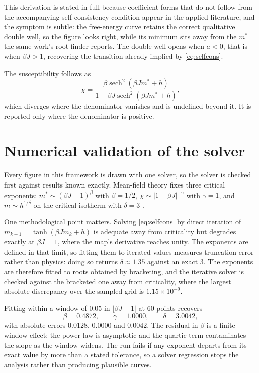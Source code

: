 This derivation is stated in full because coefficient forms that do not follow from the
accompanying self-consistency condition appear in the applied literature, and the symptom is
subtle: the free-energy curve retains the correct qualitative double well, so the figure looks
right, while its minimum sits away from the $m^\ast$ the same work's root-finder reports. The
double well opens when $a < 0$, that is when $\beta J > 1$, recovering the transition already
implied by \eqref{eq:selfcons}.

The susceptibility follows as
\begin{equation}
\chi = \frac{\beta \operatorname{sech}^2(\beta J m^\ast + h)}
            {1 - \beta J \operatorname{sech}^2(\beta J m^\ast + h)},
\label{eq:chi}
\end{equation}
which diverges where the denominator vanishes and is undefined beyond it. It is reported only
where the denominator is positive.

\section{Numerical validation of the solver}

Every figure in this framework is drawn with one solver, so the solver is checked first
against results known exactly. Mean-field theory fixes three critical exponents:
$m^\ast \sim (\beta J - 1)^{\beta}$ with $\beta = 1/2$, $\chi \sim |1-\beta J|^{-\gamma}$ with
$\gamma = 1$, and $m \sim h^{1/\delta}$ on the critical isotherm with $\delta = 3$
\cite{goldenfeld1992}.

One methodological point matters. Solving \eqref{eq:selfcons} by direct iteration of
$m_{k+1} = \tanh(\beta J m_k + h)$ is adequate away from criticality but degrades exactly at
$\beta J = 1$, where the map's derivative reaches unity. The exponents are defined in that
limit, so fitting them to iterated values measures truncation error rather than physics: doing
so returns $\delta \approx 1.35$ against an exact $3$. The exponents are therefore fitted to
roots obtained by bracketing, and the iterative solver is checked against the bracketed one
away from criticality, where the largest absolute discrepancy over the sampled grid is
$1.15\times10^{-9}$.

Fitting within a window of $0.05$ in $|\beta J - 1|$ at 60 points recovers
\begin{equation}
\beta = 0.4872, \qquad \gamma = 1.0000, \qquad \delta = 3.0042,
\end{equation}
with absolute errors $0.0128$, $0.0000$ and $0.0042$. The residual in $\beta$ is a
finite-window effect: the power law is asymptotic and the quartic term contaminates the slope
as the window widens. The run fails if any exponent departs from its exact value by more than
a stated tolerance, so a solver regression stops the analysis rather than producing plausible
curves.

